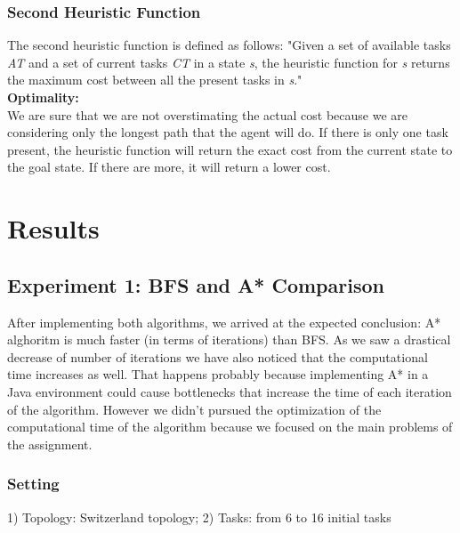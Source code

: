 \documentclass[11pt]{article}
\begin{document}
\subsubsection{Second Heuristic Function}

The second heuristic function is defined as follows: "Given a set of available tasks \textit{AT} and a set of current tasks \textit{CT} in a state \textit{s}, the heuristic function for \textit{s} returns the maximum cost between all the present tasks in \textit{s}."\\

\textbf{Optimality:}\\
We are sure that we are not overstimating the actual cost because we are considering only the longest path that the agent will do. If there is only one task present, the heuristic function will return the exact cost from the current state to the goal state. If there are more, it will return a lower cost.

\section{Results}

\subsection{Experiment 1: BFS and A* Comparison}

After implementing both algorithms, we arrived at the expected conclusion: A* alghoritm is much faster (in terms of iterations) than BFS. As we saw a drastical decrease of number of iterations we have also noticed that the computational time increases as well. That happens probably because implementing A* in a Java environment could cause bottlenecks that increase the time of each iteration of the algorithm. However we didn't pursued the optimization of the computational time of the algorithm because we focused on the main problems of the assignment.

\subsubsection{Setting}
1) Topology: Switzerland topology; 2) Tasks: from 6 to 16 initial tasks
\end{document}
